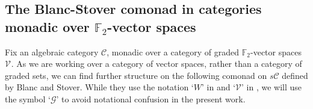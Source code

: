 \documentclass[11pt]{amsart} \renewcommand{\baselinestretch}{1.2}
\theoremstyle{plain}
\theoremstyle{definition}
\renewcommand{\to}{\longrightarrow}
\newcommand{\scrG}{\mathscr{G}}
\newcommand{\scrV}{\mathscr{V}}
\newcommand{\calV}{\mathcal{V}}
\newcommand{\calc}{\mathcal{C}}
\newcommand{\vect}[2]{\calV^{#1}_{#2}}
\newcommand{\BSW}{{\scrG}}
\newcommand{\F}{\mathbb{F}}
\newcommand{\complexes}{\mathrm{ch}_+}
\newcommand{\Ftwo}{\F_2}
\begin{document}
\begin{Composite functor spectral sequences}
\subsection{The Blanc-Stover comonad in categories monadic over $\Ftwo $-vector spaces}\label{The Blanc-Stover comonad sect}
Fix an algebraic category $\calc$, monadic over a category of graded $\Ftwo $-vector spaces $\vect{}{}$. %
As we are working over a category of vector spaces, rather than a category of graded sets, we can find further structure on  the following comonad on $s\calc$ defined by Blanc and Stover. While they  use the notation `$W$' in \cite{Blanc_Stover-Groth_SS.pdf} and `$\scrV$' in \cite{StoverVanKampen.pdf}, we will use the symbol `$\BSW$' to avoid notational confusion in the present work.

\end{Composite functor spectral sequences}
\end{document}
